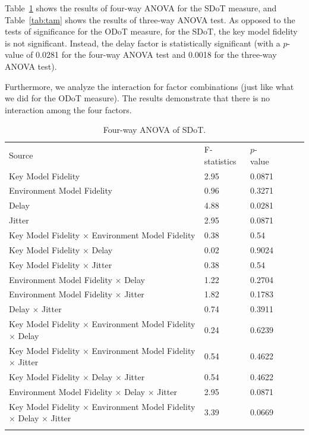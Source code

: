 Table~\ref{tab:fam} shows the results of four-way ANOVA for the SDoT measure, and Table~\ref{tab:tam} shows the results of three-way ANOVA test.
As opposed to the tests of significance for the ODoT measure, for the SDoT, the key model fidelity is not significant. Instead, the delay factor is statistically significant (with a $p$-value of 0.0281 for the four-way ANOVA test and 0.0018 for the three-way ANOVA test).

Furthermore, we analyze the interaction for factor combinations (just like what we did for the ODoT measure).
The results demonstrate that there is no interaction among the four factors.

\begin{table}[!htbp]
\caption{Four-way ANOVA of SDoT.}
\label{tab:fam}
\begin{tabular}{llllll}
\hline\noalign{\smallskip}
Source & F-statistics & $p$-value \\
\noalign{\smallskip}\hline\noalign{\smallskip}
Key Model Fidelity & 2.95 & 0.0871 \\
Environment Model Fidelity & 0.96 & 0.3271 \\
Delay & 4.88 & 0.0281 \\
Jitter & 2.95 & 0.0871 \\
Key Model Fidelity $\times$ Environment Model Fidelity & 0.38 & 0.54 \\
Key Model Fidelity $\times$ Delay & 0.02 & 0.9024 \\
Key Model Fidelity $\times$ Jitter & 0.38 & 0.54 \\
Environment Model Fidelity $\times$ Delay & 1.22 & 0.2704 \\
Environment Model Fidelity $\times$ Jitter & 1.82 & 0.1783 \\
Delay $\times$ Jitter & 0.74 & 0.3911 \\
Key Model Fidelity $\times$ Environment Model Fidelity $\times$ Delay & 0.24 & 0.6239 \\
Key Model Fidelity $\times$ Environment Model Fidelity $\times$ Jitter & 0.54 & 0.4622 \\
Key Model Fidelity $\times$ Delay $\times$ Jitter & 0.54 & 0.4622 \\
Environment Model Fidelity $\times$ Delay $\times$ Jitter & 2.95 & 0.0871 \\
Key Model Fidelity $\times$ Environment Model Fidelity $\times$ Delay $\times$ Jitter & 3.39 & 0.0669 \\
\noalign{\smallskip}\hline
\end{tabular}
\end{table}

